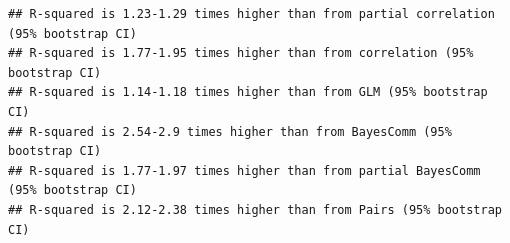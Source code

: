 \documentclass[11pt,]{article}
\newenvironment{Shaded}{\begin{snugshade}}{\end{snugshade}}
\newcommand{\KeywordTok}[1]{\textcolor[rgb]{0.13,0.29,0.53}{\textbf{{#1}}}}
\newcommand{\DecValTok}[1]{\textcolor[rgb]{0.00,0.00,0.81}{{#1}}}
\newcommand{\StringTok}[1]{\textcolor[rgb]{0.31,0.60,0.02}{{#1}}}
\newcommand{\NormalTok}[1]{{#1}}
\begin{document}
\begin{Shaded}
\end{Shaded}

\begin{verbatim}
## R-squared is 1.23-1.29 times higher than from partial correlation (95% bootstrap CI)
## R-squared is 1.77-1.95 times higher than from correlation (95% bootstrap CI)
## R-squared is 1.14-1.18 times higher than from GLM (95% bootstrap CI)
## R-squared is 2.54-2.9 times higher than from BayesComm (95% bootstrap CI)
## R-squared is 1.77-1.97 times higher than from partial BayesComm (95% bootstrap CI)
## R-squared is 2.12-2.38 times higher than from Pairs (95% bootstrap CI)
\end{verbatim}
\end{document}
